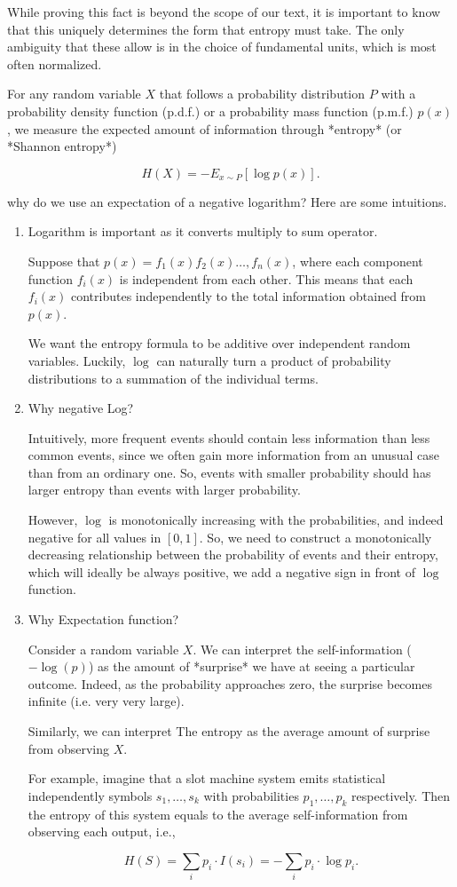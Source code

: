 While proving this fact is beyond the scope of our text, it is important to know
that this uniquely determines the form that entropy must take. The only
ambiguity that these allow is in the choice of fundamental units, which is most
often normalized.


For any random variable $X$ that follows a probability distribution $P$ with a
probability density function (p.d.f.) or a probability mass function (p.m.f.)
$p(x)$, we measure the expected amount of information through *entropy* (or
*Shannon entropy*)

$$H(X) = - E_{x \sim P} [\log p(x)].$$

why do we use an expectation of a negative logarithm? Here are some intuitions.
\begin{enumerate}
  \item Logarithm is important as it converts multiply to sum operator.
  
  Suppose that $p(x) = f_1(x) f_2(x) \ldots, f_n(x)$, where each component
  function $f_i(x)$ is independent from each other. This means that each
  $f_i(x)$ contributes independently to the total information obtained from
  $p(x)$.
  
  We want the entropy formula to be additive over independent random variables.
  Luckily, $\log$ can naturally turn a product of probability distributions to a
  summation of the individual terms.
  
  \item Why negative Log? 
  
  Intuitively, more frequent events should contain less information than less
  common events, since we often gain more information from an unusual case than
  from an ordinary one. So, events with smaller probability should has larger
  entropy than events with larger probability.
  
  However, $\log$ is monotonically increasing with the probabilities, and indeed
  negative for all values in $[0, 1]$.
  So, we need to construct a monotonically decreasing relationship between the
  probability of events and their entropy, which will ideally be always
  positive, we add a negative sign in front of $\log$ function.
  
  \item Why Expectation function?
  
   Consider a random variable $X$. We can interpret the self-information
   ($-\log(p)$) as the amount of *surprise* we have at seeing a particular
   outcome. Indeed, as the probability approaches zero, the surprise becomes
   infinite (i.e. very very large).
   
   Similarly, we can interpret The entropy as the average amount of surprise
   from observing $X$.
   
   For example, imagine that a slot machine system emits statistical
   independently symbols ${s_1, \ldots, s_k}$ with probabilities ${p_1, \ldots,
   p_k}$ respectively. Then the entropy of this system equals to the average
   self-information from observing each output, i.e.,
   
   $$H(S) = \sum_i {p_i \cdot I(s_i)} = - \sum_i {p_i \cdot \log p_i}.$$
   
   
\end{enumerate}


